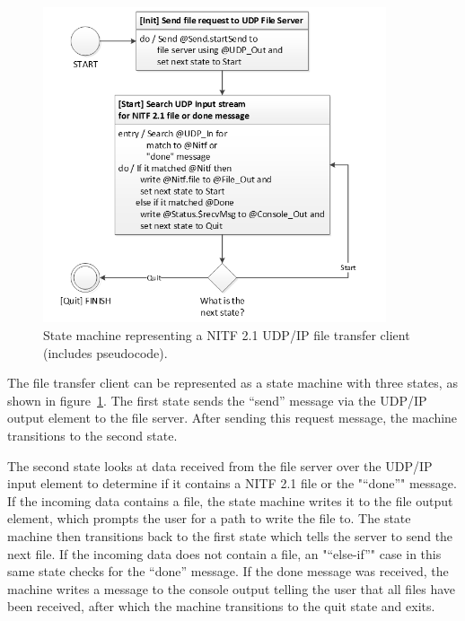 \begin{figure}[htbp]
\centering
\includegraphics[width=0.9\textwidth]{figures/NitfFileClientUmlStateMachine.png}
\caption[State machine representing a NITF 2.1 UDP/IP file transfer client]{State machine representing a NITF 2.1 UDP/IP file transfer client (includes pseudocode).}
\label{fig:NitfFileClientUmlStateMachine}
\end{figure}

\indent
The file transfer client can be represented as a state machine with three states, as shown in figure~\ref{fig:NitfFileClientUmlStateMachine}.  The first state sends the “send” message via the UDP/IP output element to the file server.  After sending this request message, the machine transitions to the second state.

\indent
The second state looks at data received from the file server over the UDP/IP input element to determine if it contains a NITF 2.1 file or the "“done”" message.  If the incoming data contains a file, the state machine writes it to the file output element, which prompts the user for a path to write the file to.  The state machine then transitions back to the first state which tells the server to send the next file.  If the incoming data does not contain a file, an "“else-if”" case in this same state checks for the “done” message.  If the done message was received, the machine writes a message to the console output telling the user that all files have been received, after which the machine transitions to the quit state and exits.

